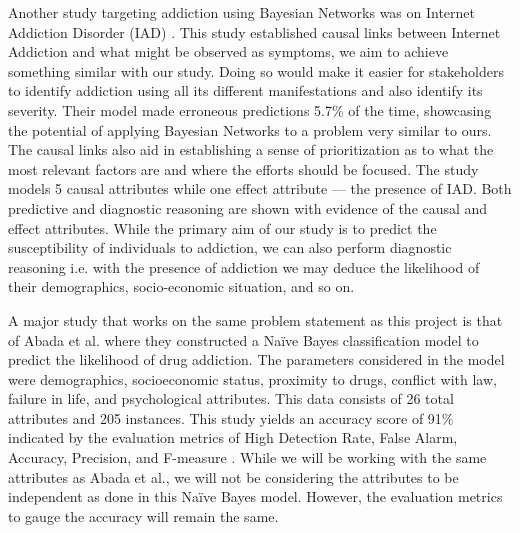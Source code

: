 \documentclass[conference]{IEEEtran}
\begin{document}
Another study targeting addiction using Bayesian Networks was on Internet Addiction Disorder (IAD) \cite{singh_internet_addiction_bayesian}. This study established causal links between Internet Addiction and what might be observed as symptoms, we aim to achieve something similar with our study. Doing so would make it easier for stakeholders to identify addiction using all its different manifestations and also identify its severity. Their model made erroneous predictions 5.7\% of the time, showcasing the potential of applying Bayesian Networks to a problem very similar to ours. The causal links also aid in establishing a sense of prioritization as to what the most relevant factors are and where the efforts should be focused. The study models 5 causal attributes while one effect attribute — the presence of IAD. Both predictive and diagnostic reasoning are shown with evidence of the causal and effect attributes. While the primary aim of our study is to predict the susceptibility of individuals to addiction, we can also perform diagnostic reasoning i.e. with the presence of addiction we may deduce the likelihood of their demographics, socio-economic situation, and so on.

A major study that works on the same problem statement as this project is that of Abada et al. where they constructed a Naïve Bayes classification model to predict the likelihood of drug addiction. The parameters considered in the model were demographics, socioeconomic status, proximity to drugs, conflict with law, failure in life, and psychological attributes. This data consists of 26 total attributes and 205 instances. This study yields an accuracy score of 91\% indicated by the evaluation metrics of High Detection Rate, False Alarm, Accuracy, Precision, and F-measure \cite{abada_bayesian_model_drug_addiction}. While we will be working with the same attributes as Abada et al., we will not be considering the attributes to be independent as done in this Naïve Bayes model. However, the evaluation metrics to gauge the accuracy will remain the same.
\end{document}
